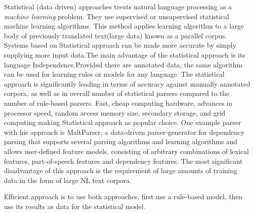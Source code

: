 \documentclass[sigconf]{acmart}
\begin{document}
   Statistical (data driven) approaches treats natural language processing as a \textit{machine learning} problem. They use supervised or unsupervised statistical machine learning algorithms. This method applies learning algorithm to a large body of previously translated text(large data) known as a parallel corpus. Systems based on Statistical approach can be made more accurate by simply supplying more input data.The main advantage of the statistical approach is its language Independence.Provided there are annotated data, the same algorithm can be used for learning rules or models for any language. The statistical approach is significantly leading in terms of accuracy against manually annotated corpora, as well as in overall number of statistical parsers compared to the number of rule-based parsers. Fast, cheap computing hardware, advances in processor speed, random access memory size, secondary storage, and grid computing making Statistical approach as popular choice. One example parser with his approach is MaltParser, a data-driven parser-generator for dependency parsing  that  supports  several  parsing  algorithms  and  learning  algorithms and allows user-defined feature models, consisting of arbitrary combinations of lexical features, part-of-speech features and dependency features. The most significant disadvantage of this approach is the requirement of large amounts of training data in the form of large NL text corpora. 
\par\null\par
Efficient approach is to use both approaches, first use a rule-based model, then use its results as data for the statistical model. 
\end{document}
